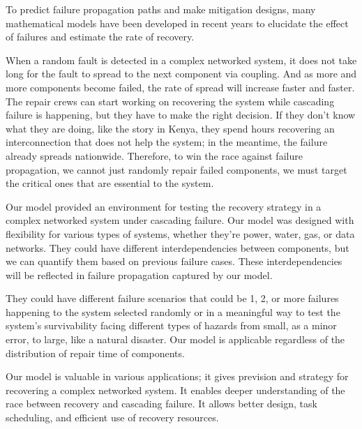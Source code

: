 \documentclass[runningheads]{llncs}
\begin{document}
To predict failure propagation paths and make mitigation designs, many mathematical models have been developed in recent years to elucidate the effect of failures and estimate the rate of recovery. 

When a random fault is detected in a complex networked system, it does not take long for the fault to spread to the next component via coupling. And as more and more components become failed, the rate of spread will increase faster and faster. The repair crews can start working on recovering the system while cascading failure is happening, but they have to make the right decision. If they don't know what they are doing, like the story in Kenya, they spend hours recovering an interconnection that does not help the system; in the meantime, the failure already spreads nationwide. 
Therefore, to win the race against failure propagation, we cannot just randomly repair failed components, we must target the critical ones that are essential to the system. 

Our model provided an environment for testing the recovery strategy in a complex networked system under cascading failure. Our model was designed with flexibility for various types of systems, whether they're power, water, gas, or data networks. 
They could have different interdependencies between components, but we can quantify them based on previous failure cases. These interdependencies will be reflected in failure propagation captured by our model. 

They could have different failure scenarios that could be 1, 2, or more failures happening to the system selected randomly or in a meaningful way to test the system's survivability facing different types of hazards from small, as a minor error, to large, like a natural disaster. Our model is applicable regardless of the distribution of repair time of components. 

Our model is valuable in various applications; it gives prevision and strategy for recovering a complex networked system. It enables deeper understanding of the race between recovery and cascading failure. It allows better design, task scheduling, and efficient use of recovery resources. 
\end{document}
